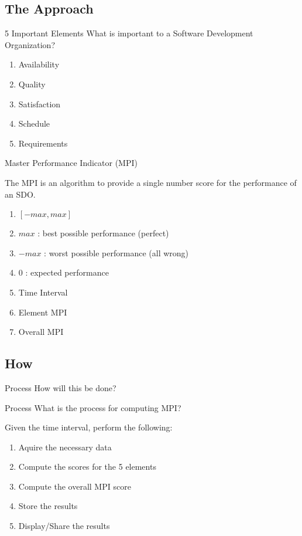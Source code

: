 \subsection{The Approach}

\begin{frame}{5 Important Elements}
    What is important to a Software Development Organization?
    
    \begin{enumerate}
        \item Availability 
        \item Quality
        \item Satisfaction
        \item Schedule
        \item Requirements
    \end{enumerate}
\end{frame}

\begin{frame}{Master Performance Indicator (MPI)}
    \begin{displayquote}
    The MPI is an algorithm to provide a single number score
    for the performance of an SDO.
    \end{displayquote}
    
    \begin{enumerate}
        \item $[-max, max]$
        \item $max$ : best possible performance (perfect)
        \item $-max$ : worst possible performance (all wrong)
        \item $0$ : expected performance
        \item Time Interval
        \item Element MPI
        \item Overall MPI
    \end{enumerate}
\end{frame}

\subsection{How}

\begin{frame}{Process}
    How will this be done?
\end{frame}

\begin{frame}{Process}
    What is the process for computing MPI?
    
    Given the time interval, perform the following:
    
    \begin{enumerate}
        \item Aquire the necessary data
        \item Compute the scores for the 5 elements
        \item Compute the overall MPI score
        \item Store the results
        \item Display/Share the results
    \end{enumerate}
\end{frame}

